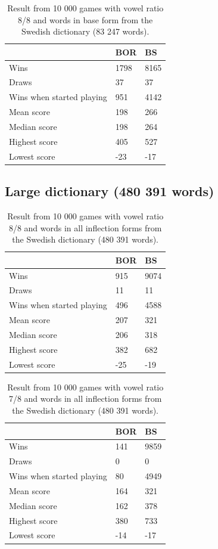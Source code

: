 \documentclass[a4paper, 12pt]{report}
\begin{document}
\begin{table}[h]
\centering
    \begin{tabular}{ l | l | l }
   	& BOR & BS \\
   	\hline
   	Wins & 1798 & 8165 \\
	Draws & 37 & 37 \\
	Wins when started playing & 951 & 4142 \\   	
	Mean score & 198 & 266 \\
	Median score & 198 & 264\\	 	 
	Highest score & 405 & 527 \\
	Lowest score & -23 & -17 \\		
    \end{tabular}
\caption{Result from 10 000 games with vowel ratio 8/8 and words in base form from the Swedish dictionary (83 247 words).}
\label{tab:borbsstats8smallDict}
\end{table}

\subsection{Large dictionary (480 391 words)}
\begin{table}[h]
\centering
    \begin{tabular}{ l | l | l }
   	& BOR & BS \\
   	\hline
   	Wins & 915 & 9074 \\
	Draws & 11 & 11 \\
	Wins when started playing & 496 & 4588 \\   	
	Mean score & 207 & 321 \\
	Median score & 206 & 318\\	 	 
	Highest score & 382 & 682 \\
	Lowest score & -25 & -19 \\		
    \end{tabular}
\caption{Result from 10 000 games with vowel ratio 8/8 and words in all inflection forms from the Swedish dictionary (480 391 words).}
\label{tab:borbsstats8}
\end{table}

\begin{table}[h]
\centering
    \begin{tabular}{ l | l | l }
   	& BOR & BS \\
   	\hline
   	Wins & 141 & 9859 \\
	Draws & 0 & 0 \\
	Wins when started playing & 80 & 4949 \\   	
	Mean score & 164 & 321 \\
	Median score & 162 & 378\\	 	 
	Highest score & 380 & 733 \\
	Lowest score & -14 & -17 \\		
    \end{tabular}
\caption{Result from 10 000 games with vowel ratio 7/8 and words in all inflection forms from the Swedish dictionary (480 391 words).}
\label{tab:borbsstats7}
\end{table}
\end{document}
